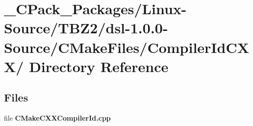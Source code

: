 \section{\_\-CPack\_\-Packages/Linux-\/Source/TBZ2/dsl-\/1.0.0-\/Source/CMakeFiles/CompilerIdCXX/ Directory Reference}
\label{dir_e2a44c97d2324548151e58c7b02e817f}
\subsection*{Files}
\begin{DoxyCompactItemize}
\item 
file {\bf CMakeCXXCompilerId.cpp}
\end{DoxyCompactItemize}
